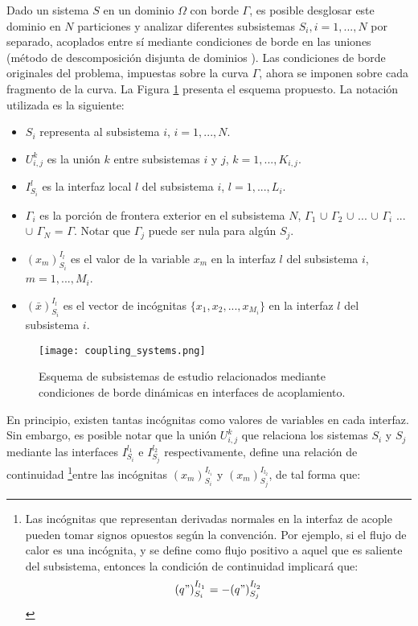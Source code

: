 Dado un sistema $S$ en un dominio $\Omega$ con borde $\Gamma$, es posible desglosar este dominio en $N$ particiones 
y analizar diferentes subsistemas $S_i,i=1,...,N$ por separado, acoplados entre sí mediante condiciones de borde en las uniones
(método de descomposición disjunta de dominios \cite{ddmethod}).
Las condiciones de borde originales del problema, impuestas sobre la curva $\Gamma$,
ahora se imponen sobre cada fragmento de la curva.
La Figura \ref{esquema-acoplamiento} presenta el esquema propuesto.
La notación utilizada es la siguiente:
\begin{itemize}
\item $S_i$ representa al subsistema $i$, $i=1,...,N$.
\item $U_{i,j}^k$ es la unión $k$ entre subsistemas $i$ y $j$, $k=1,...,K_{i,j}$.
\item $I_{S_i}^{l}$ es la interfaz local $l$ del subsistema $i$, $l=1,...,L_i$.
\item $\Gamma_i$ es la porción de frontera exterior en el subsistema $N$,
 $\Gamma_1$ $\cup$ $\Gamma_2$ $\cup$ ... $\cup$ $\Gamma_i$ ...  $\cup$ $\Gamma_N$ = $\Gamma$.
 Notar que $\Gamma_j$ puede ser nula para algún $S_j$.
\item ${(x_m)_{S_i}^{I_l}}$ es el valor de la variable $x_m$ en la interfaz ${l}$ del subsistema ${i}$, $m=1,...,M_i$.
\item ${(\bar{x})_{S_i}^{I_l}}$ es el vector de incógnitas $\{x_1,x_2,...,x_{M_i}\}$ en la interfaz ${l}$ del subsistema ${i}$.
\end{itemize}

\begin{figure}[ht]
\centering{}\texttt{[image: coupling\_systems.png]}
\caption[Esquema de descomposición disjunta de dominios]{Esquema de subsistemas de estudio relacionados mediante condiciones de borde dinámicas en interfaces de acoplamiento.} 
\label{esquema-acoplamiento} 
\end{figure}

En principio, existen tantas incógnitas como valores de variables en cada interfaz.
Sin embargo, es posible notar que la unión $U_{i,j}^k$ que relaciona los sistemas $S_{i}$ y $S_{j}$ 
mediante las interfaces $I_{S_{i}}^{l_1}$ e $I_{S_{j}}^{l_2}$ respectivamente, 
define una relación de continuidad
\footnote{
Las incógnitas que representan derivadas normales en la interfaz de acople pueden tomar signos opuestos según la convención.
Por ejemplo, si el flujo de calor es una incógnita, 
y se define como flujo positivo a aquel que es saliente del subsistema, 
entonces la condición de continuidad implicará que:
\begin{equation*}
{(q")_{S_i}^{I_{l_1}}}=-{(q")_{S_j}^{I_{l_2}}}
\label{continuidad-q}
\end{equation*}
}entre las incógnitas ${(x_m)_{S_i}^{I_{l_1}}}$ y ${(x_m)_{S_j}^{I_{l_2}}}$, de tal forma que:

